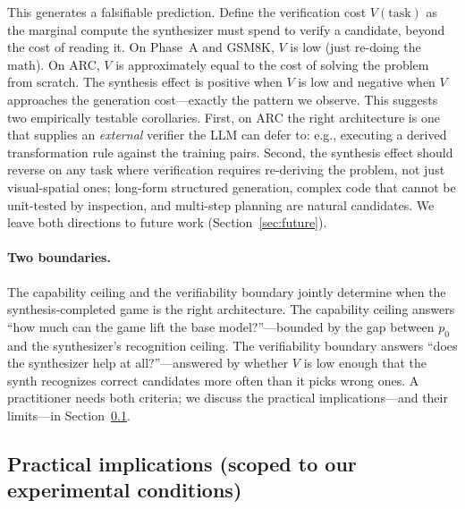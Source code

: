 \documentclass[11pt]{amsart}
\newcommand\1{{\mathds{1}}}
\theoremstyle{definition}
\theoremstyle{remark}
\numberwithin{equation}{section}
\begin{document}
This generates a falsifiable prediction.
Define the verification cost $V(\text{task})$ as the marginal compute the synthesizer must spend to verify a candidate, beyond the cost of reading it.
On Phase~A and GSM8K, $V$ is low (just re-doing the math).
On ARC, $V$ is approximately equal to the cost of solving the problem from scratch.
The synthesis effect is positive when $V$ is low and negative when $V$ approaches the generation cost---exactly the pattern we observe.
This suggests two empirically testable corollaries.
First, on ARC the right architecture is one that supplies an \emph{external} verifier the LLM can defer to: e.g., executing a derived transformation rule against the training pairs.
Second, the synthesis effect should reverse on any task where verification requires re-deriving the problem, not just visual-spatial ones; long-form structured generation, complex code that cannot be unit-tested by inspection, and multi-step planning are natural candidates.
We leave both directions to future work (Section~\ref{sec:future}).

\paragraph{Two boundaries.}
The capability ceiling and the verifiability boundary jointly determine when the synthesis-completed game is the right architecture.
The capability ceiling answers ``how much can the game lift the base model?''---bounded by the gap between $p_0$ and the synthesizer's recognition ceiling.
The verifiability boundary answers ``does the synthesizer help at all?''---answered by whether $V$ is low enough that the synth recognizes correct candidates more often than it picks wrong ones.
A practitioner needs both criteria; we discuss the practical implications---and their limits---in Section~\ref{sec:decision-tree}.

\subsection{Practical implications (scoped to our experimental conditions)}\label{sec:decision-tree}
\end{document}
